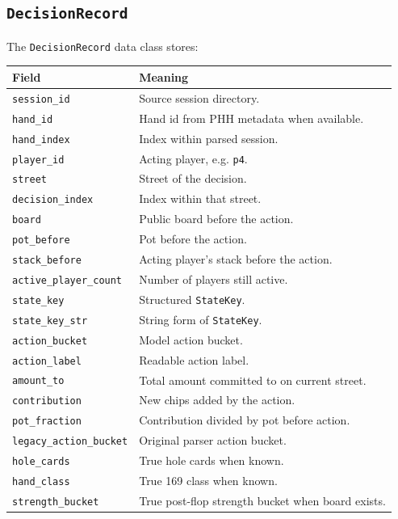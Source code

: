 \documentclass[11pt]{article}
\begin{document}
\subsection{\texttt{DecisionRecord}}

The \texttt{DecisionRecord} data class stores:

\begin{longtable}{lp{10cm}}
\toprule
\textbf{Field} & \textbf{Meaning} \\
\midrule
\texttt{session\_id} & Source session directory. \\
\texttt{hand\_id} & Hand id from PHH metadata when available. \\
\texttt{hand\_index} & Index within parsed session. \\
\texttt{player\_id} & Acting player, e.g. \texttt{p4}. \\
\texttt{street} & Street of the decision. \\
\texttt{decision\_index} & Index within that street. \\
\texttt{board} & Public board before the action. \\
\texttt{pot\_before} & Pot before the action. \\
\texttt{stack\_before} & Acting player's stack before the action. \\
\texttt{active\_player\_count} & Number of players still active. \\
\texttt{state\_key} & Structured \texttt{StateKey}. \\
\texttt{state\_key\_str} & String form of \texttt{StateKey}. \\
\texttt{action\_bucket} & Model action bucket. \\
\texttt{action\_label} & Readable action label. \\
\texttt{amount\_to} & Total amount committed to on current street. \\
\texttt{contribution} & New chips added by the action. \\
\texttt{pot\_fraction} & Contribution divided by pot before action. \\
\texttt{legacy\_action\_bucket} & Original parser action bucket. \\
\texttt{hole\_cards} & True hole cards when known. \\
\texttt{hand\_class} & True 169 class when known. \\
\texttt{strength\_bucket} & True post-flop strength bucket when board exists. \\
\bottomrule
\end{longtable}
\end{document}
